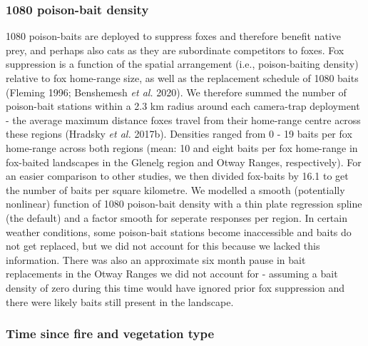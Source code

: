 \documentclass[11pt,a4paper,titlepage,twoside,openright]{style/unimelbthesis}
\begin{document}
\begin{mainmatter}
\hypertarget{poison-bait-density}{%
\subsubsection{1080 poison-bait density}\label{poison-bait-density}}

1080 poison-baits are deployed to suppress foxes and therefore benefit native prey, and perhaps also cats as they are subordinate competitors to foxes. Fox suppression is a function of the spatial arrangement (i.e., poison-baiting density) relative to fox home-range size, as well as the replacement schedule of 1080 baits (Fleming 1996; Benshemesh \emph{et al.} 2020). We therefore summed the number of poison-bait stations within a 2.3 km radius around each camera-trap deployment - the average maximum distance foxes travel from their home-range centre across these regions (Hradsky \emph{et al.} 2017b). Densities ranged from 0 - 19 baits per fox home-range across both regions (mean: 10 and eight baits per fox home-range in fox-baited landscapes in the Glenelg region and Otway Ranges, respectively). For an easier comparison to other studies, we then divided fox-baits by 16.1 to get the number of baits per square kilometre. We modelled a smooth (potentially nonlinear) function of 1080 poison-bait density with a thin plate regression spline (the default) and a factor smooth for seperate responses per region. In certain weather conditions, some poison-bait stations become inaccessible and baits do not get replaced, but we did not account for this because we lacked this information. There was also an approximate six month pause in bait replacements in the Otway Ranges we did not account for - assuming a bait density of zero during this time would have ignored prior fox suppression and there were likely baits still present in the landscape.

\hypertarget{time-since-fire-and-vegetation-type}{%
\subsubsection{Time since fire and vegetation type}\label{time-since-fire-and-vegetation-type}}


\end{mainmatter}
\end{document}
